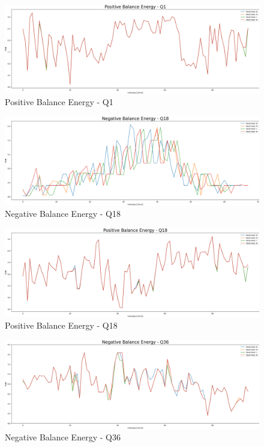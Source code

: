 \begin{figure}[!h]
	\includegraphics[width=1\linewidth]{pictures/results/Positive Balance Energy - Q1.png}
	\caption{Positive Balance Energy - Q1}
	\label{fig:Positive Balance Energy - Q1}
\end{figure}

\begin{figure}[!h]
	\includegraphics[width=1\linewidth]{pictures/results/Negative Balance Energy - Q18.png}
	\caption{Negative Balance Energy - Q18}
	\label{fig:Negative Balance Energy - Q18}
\end{figure}

\begin{figure}[!h]
	\includegraphics[width=1\linewidth]{pictures/results/Positive Balance Energy - Q18.png}
	\caption{Positive Balance Energy - Q18}
	\label{fig:Positive Balance Energy - Q18}
\end{figure}

\begin{figure}[!h]
	\includegraphics[width=1\linewidth]{pictures/results/Negative Balance Energy - Q36.png}
	\caption{Negative Balance Energy - Q36}
	\label{fig:Negative Balance Energy - Q36}
\end{figure}


